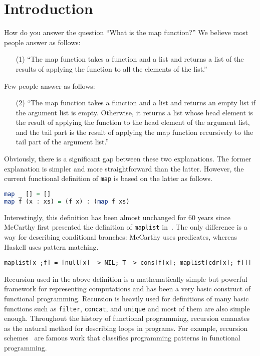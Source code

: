 \documentclass{article}
\newcommand{\todo}[1]{\textcolor{red}{(TODO: #1)}}
\begin{document}
\section{Introduction}\label{introduction} %

How do you answer the question ``What is the map function?''
We believe most people answer as follows:

\begin{itemize}
\item[(1)] ``The map function takes a function and a list and returns a list of the results of applying the function to all the elements of the list.''
\end{itemize}

\noindent Few people answer as follows:

\begin{itemize}
\item[(2)] ``The map function takes a function and a list and returns an empty list if the argument list is empty. Otherwise, it returns a list whose head element is the result of applying the function to the head element of the argument list, and the tail part is the result of applying the map function recursively to the tail part of the argument list.''
\end{itemize}

Obviously, there is a significant gap between these two explanations.
The former explanation is simpler and more straightforward than the latter.
However, the current functional definition of \texttt{map} is based on the latter as follows.

\begin{lstlisting}[language=haskell]
map _ [] = []
map f (x : xs) = (f x) : (map f xs)
\end{lstlisting}

\noindent Interestingly, this definition has been almost unchanged for 60 years since McCarthy first presented the definition of \texttt{maplist} in~\cite{mccarthy1958maplist}.
The only difference is a way for describing conditional branches: McCarthy uses predicates, whereas Haskell uses pattern matching.

\begin{lstlisting}
maplist[x ;f] = [null[x] -> NIL; T -> cons[f[x]; maplist[cdr[x]; f]]]
\end{lstlisting}

Recursion used in the above definition is a mathematically simple but powerful framework for representing computations and has been a very basic construct of functional programming.
Recursion is heavily used for definitions of many basic functions such as \texttt{filter}, \texttt{concat}, and \texttt{unique} and most of them are also simple enough.
Throughout the history of functional programming, recursion emanates as the natural method for describing loops in programs.
For example, recursion schemes~\cite{meijer1991functional} are famous work that classifies programming patterns in functional programming.
\end{document}
